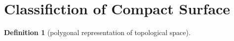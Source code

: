 \documentclass[12pt,a4paper]{book}
\theoremstyle{definition}
\newtheorem{defn}{Definition}[section]
\begin{document}
\section{Classifiction of Compact Surface }
\begin{defn}[polygonal representation of topological space]




\end{defn}
\end{document}
